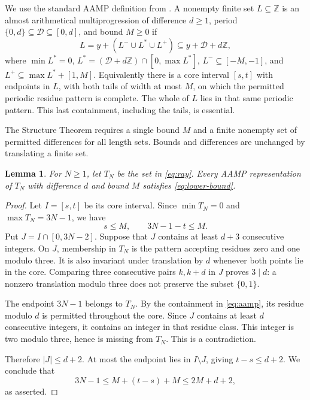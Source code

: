 \documentclass[11pt]{article}
\newtheorem{lemma}[theorem]{Lemma}
\theoremstyle{definition}
\begin{document}
We use the standard AAMP definition from \cite[Section 5]{GK}. A nonempty finite set $L\subseteq\mathbb Z$ is an almost arithmetical multiprogression of difference $d\geq1$, period $\{0,d\}\subseteq\mathcal D\subseteq[0,d]$, and bound $M\geq0$ if
\begin{equation}\label{eq:aamp}
 L=y+(L^-\cup L^*\cup L^+)\subseteq y+\mathcal D+d\mathbb Z,
\end{equation}
where $\min L^*=0$, $L^*=(\mathcal D+d\mathbb Z)\cap[0,\max L^*]$, $L^-\subseteq[-M,-1]$, and $L^+\subseteq\max L^*+[1,M]$. Equivalently there is a core interval $[s,t]$ with endpoints in $L$, with both tails of width at most $M$, on which the permitted periodic residue pattern is complete. The whole of $L$ lies in that same periodic pattern. This last containment, including the tails, is essential.

The Structure Theorem requires a single bound $M$ and a finite nonempty set of permitted differences for all length sets. Bounds and differences are unchanged by translating a finite set.

\begin{lemma}\label{lem:obstruction}
For $N\geq1$, let $T_N$ be the set in \eqref{eq:ray}. Every AAMP representation of $T_N$ with difference $d$ and bound $M$ satisfies \eqref{eq:lower-bound}.
\end{lemma}
\begin{proof}
Let $I=[s,t]$ be its core interval. Since $\min T_N=0$ and $\max T_N=3N-1$, we have
\[
 s\leq M,\qquad 3N-1-t\leq M.
\]
Put $J=I\cap[0,3N-2]$. Suppose that $J$ contains at least $d+3$ consecutive integers. On $J$, membership in $T_N$ is the pattern accepting residues zero and one modulo three. It is also invariant under translation by $d$ whenever both points lie in the core. Comparing three consecutive pairs $k,k+d$ in $J$ proves $3\mid d$: a nonzero translation modulo three does not preserve the subset $\{0,1\}$.

The endpoint $3N-1$ belongs to $T_N$. By the containment in \eqref{eq:aamp}, its residue modulo $d$ is permitted throughout the core. Since $J$ contains at least $d$ consecutive integers, it contains an integer in that residue class. This integer is two modulo three, hence is missing from $T_N$. This is a contradiction.

Therefore $|J|\leq d+2$. At most the endpoint lies in $I\setminus J$, giving $t-s\leq d+2$. We conclude that
\[
 3N-1\leq M+(t-s)+M\leq2M+d+2,
\]
as asserted.
\end{proof}
\end{document}

